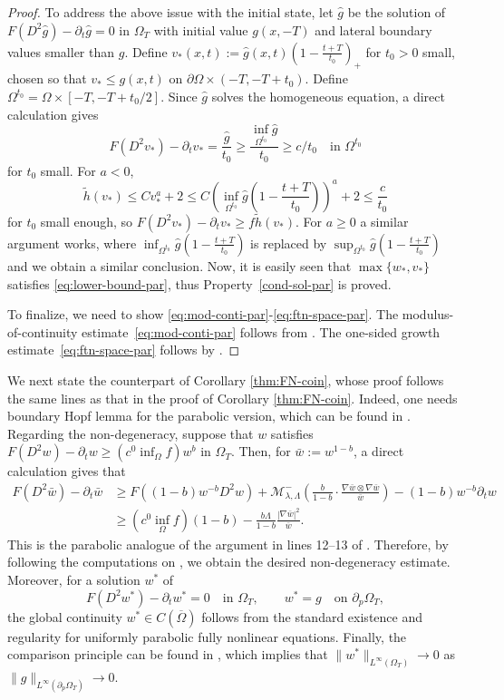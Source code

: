 \documentclass[11pt,oneside,english]{amsart}
\newcommand{\cM}{{\mathcal M}}
\newcommand{\la}{\lambda}
\newcommand{\D}{\nabla}
\numberwithin{equation}{section}
\theoremstyle{plain}
\numberwithin{equation}{section}
\begin{document}
\begin{proof}
To address the above issue with the initial state, let $\hat g$ be the solution of $F(D^2\hat g)-\partial_t\hat g=0$
in $\Omega_T$ with initial value $g(x,-T)$ and lateral boundary values 
smaller than $g$. Define $ v_*(x,t) := \hat g(x,t)\left(1-\frac{t+T}{t_0}\right)_+$
for $t_0>0$ small, chosen so that $v_*\le g(x,t)$ on
$\partial\Omega\times(-T,-T+t_0)$. Define $\Omega^{t_0} = \Omega \times [-T,-T+t_0/2] $. Since $\hat g$ solves the
homogeneous equation, a direct calculation gives
$$F(D^2v_*)-\partial_t v_* =  \frac{\hat g}{t_0}
 \geq \frac{\inf_{\Omega^{t_0}}\hat g}{t_0}\ge c/t_0 \quad\text{in }\Omega^{t_0}$$ for
$t_0$ small. For $a<0$,
\[
  \tilde h(v_*)\le Cv_*^a+2\le C\left(\inf_{\Omega^{t_0}} \hat g\!\left(1-\frac{t+T}{t_0}\right)\right)^{\!a}+2
  \le \frac{c}{t_0}
\]
for $t_0$ small enough, so $F(D^2v_*)-\partial_t v_*\ge
f\tilde h(v_*)$. For $a\geq 0$ a similar argument works, where $\inf_{\Omega^{t_0}} \hat g\left(1-\frac{t+T}{t_0}\right)$ is replaced by $\sup_{\Omega^{t_0}} \hat g\left(1-\frac{t+T}{t_0}\right)$ and we obtain a similar conclusion. 
Now, it is easily seen that $\max\{w_*,v_*\}$ satisfies \eqref{eq:lower-bound-par}, thus Property~\ref{cond-sol-par} is proved.

To finalize, we need to show   \eqref{eq:mod-conti-par}-\eqref{eq:ftn-space-par}.  The modulus-of-continuity estimate~\eqref{eq:mod-conti-par} follows from \cite[Section 4.1--4.2]{AraSaUrb24}. The one-sided growth
estimate~\eqref{eq:ftn-space-par} follows by 
\cite[Corollary 1]{AraSaUrb24}.
\end{proof}

We next state  the counterpart of Corollary \ref{thm:FN-coin}, whose proof follows the same lines as that in the proof of Corollary \ref{thm:FN-coin}.  Indeed, one needs boundary Hopf lemma for the parabolic version, which can be found in 
\cite[Section 4]{CaffarelliLiNirenberg2013}.
Regarding the non-degeneracy, suppose that $w$ satisfies $F(D^2w)-\partial_tw\ge (c^0\inf_\Omega f)w^b$ in $\Omega_T$. Then, for $\bar w:=w^{1-b}$, a direct calculation gives that
\begin{align*}
    F(D^2\bar w)-\partial_t\bar w&\ge F\left((1-b)w^{-b}D^2w\right)+\cM_{\la,\Lambda}^-\left(\frac{b}{1-b}\cdot\frac{\D \bar w\otimes\D \bar w}{\bar w}\right)-(1-b)w^{-b}\partial_tw\\
    &\ge (c^0\inf_\Omega f)(1-b)-\frac{b\Lambda}{1-b}\frac{|\D\bar w|^2}{\bar w}.
\end{align*}
This is the parabolic analogue of the argument in lines 12–13 of \cite[page 463]{JeoSha24}. Therefore, by following the computations on \cite[pages 463-464]{JeoSha24}, we obtain the desired non-degeneracy estimate.
Moreover, for a solution $w^*$ of
$$
F(D^2w^*)-\partial_tw^*=0\quad\text{in }\Omega_T,\qquad w^*=g\quad\text{on }\partial_p\Omega_T,
$$
the global continuity $w^*\in C(\overline \Omega)$ follows from the standard existence and regularity for uniformly parabolic fully nonlinear equations. Finally, the comparison principle can be found in \cite[Theorem~14.1]{Lie96}, which implies that $\|w^*\|_{L^\infty(\Omega_T)}\to0$ as $\|g\|_{L^\infty(\partial_p\Omega_T)}\to0$.
\end{document}
